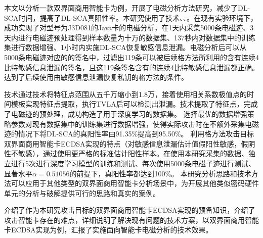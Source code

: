 {		
	本文以分析一款双界面商用智能卡为例，开展了电磁分析方法研究，减少了DL-SCA时间，提高了DL-SCA真阳性率。本研究使用了\yuchuli 技术、\shujuzengqiang、\jiashejianyanguji。在现有实验环境下，成功实现了对型号为J3D081的Java卡的电磁分析，在1天内采集5000条电磁迹、3天内进行电磁迹预处理得到样本数量为十万的数据集、137秒内对数据集中的训练集进行数据增强、1小时内实施DL-SCA恢复敏感信息泄漏。电磁分析后可以从5000条电磁迹对应的的签名中，过滤出119条可以被后续格方法所利用的含有连续4比特敏感信息泄漏的签名，且这119条签名含有的连续4比特敏感信息泄漏都正确。达到了后续使用由敏感信息泄漏恢复私钥的格方法的条件。%
	
	\yuchuli 技术通过\poifanwei 技术将特征点范围从五千万缩小到1.8万，接着使用相关系数极值点的时间模板实现特征点提取，执行TVLA后可以检测出泄漏。\yuchuli 技术提取了特征点，完成了电磁迹的预处理，成功构造了用于深度学习的数据集。
	\shujuzengqiang 选择最优的数据增强策略参数对现有数据集中的训练集进行数据增强，使得实际攻击时在不额外采集电磁迹的情况下将DL-SCA的真阳性率由91.35\%提高到95.50\%。
	\jiashejianyanguji 利用格方法攻击目标双界面商用智能卡ECDSA实现的特点（对敏感信息泄漏估计值假阳性敏感，假阴性不敏感），通过使用更严格的标准估计阳性样本。在使用本研究采集的数据、独立进行5次进行深度学习模型的训练和测试、每次使用5000条电磁子迹进行测试、显著水平$\alpha=0.51056$的前提下，真阳性率都达到100\%。
	本研究分析思路和技术方法可以应用于其他类型的双界面商用智能卡分析场景中，为开展其他类似密码硬件单元的分析与破解提供可行的思路和真实的案例。
	
	介绍了作为本研究攻击目标的双界面商用智能卡ECDSA实现的预备知识，介绍了攻击智能卡存在的难点，详细说明了解决现有问题的技术方案，以双界面商用智能卡ECDSA实现为例，汇报了实施面向智能卡电磁分析的技术效果。
	
}
